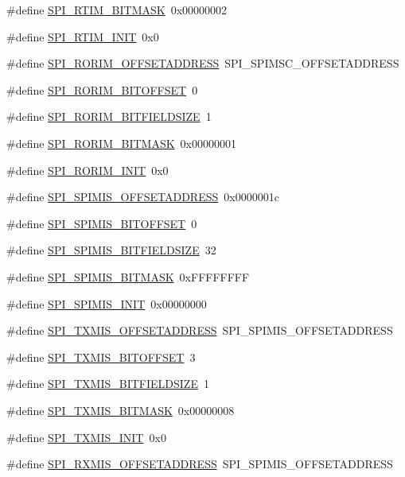 \begin{DoxyCompactItemize}
\#define \hyperlink{a00573_a226360e8192363369a8ad546547f9a1f}{SPI\_\-RTIM\_\-BITMASK}~0x00000002
\item 
\#define \hyperlink{a00573_a92d40cfc57918105d17238c10b8e492e}{SPI\_\-RTIM\_\-INIT}~0x0
\item 
\#define \hyperlink{a00573_a495f3db6f3a59bfa4e33a6a8778c19de}{SPI\_\-RORIM\_\-OFFSETADDRESS}~SPI\_\-SPIMSC\_\-OFFSETADDRESS
\item 
\#define \hyperlink{a00573_a0f4f331185afea92b5efb19347c02fec}{SPI\_\-RORIM\_\-BITOFFSET}~0
\item 
\#define \hyperlink{a00573_aa7026cd01d9579f79ab7987fa61c3e46}{SPI\_\-RORIM\_\-BITFIELDSIZE}~1
\item 
\#define \hyperlink{a00573_ae4cab1a633155b6b56dd67e53bb9d17d}{SPI\_\-RORIM\_\-BITMASK}~0x00000001
\item 
\#define \hyperlink{a00573_a0ffce744f6e410787ca6b112cc33a630}{SPI\_\-RORIM\_\-INIT}~0x0
\item 
\#define \hyperlink{a00573_adc1d8bcb31e8c25fd6524d7cebb6ed75}{SPI\_\-SPIMIS\_\-OFFSETADDRESS}~0x0000001c
\item 
\#define \hyperlink{a00573_abbf262ace71c155ba67496acc7dd735a}{SPI\_\-SPIMIS\_\-BITOFFSET}~0
\item 
\#define \hyperlink{a00573_af362e131cb4eb93e36eb27ff5c7c319b}{SPI\_\-SPIMIS\_\-BITFIELDSIZE}~32
\item 
\#define \hyperlink{a00573_a24a2e0fa5878b0c6949ad82bb66a7992}{SPI\_\-SPIMIS\_\-BITMASK}~0xFFFFFFFF
\item 
\#define \hyperlink{a00573_ace9032ae14156b64859571b63c291893}{SPI\_\-SPIMIS\_\-INIT}~0x00000000
\item 
\#define \hyperlink{a00573_a17fdcc0d678721c6e51d71df679e91a5}{SPI\_\-TXMIS\_\-OFFSETADDRESS}~SPI\_\-SPIMIS\_\-OFFSETADDRESS
\item 
\#define \hyperlink{a00573_a6625dd3bc7e72078abe177c01fa2497b}{SPI\_\-TXMIS\_\-BITOFFSET}~3
\item 
\#define \hyperlink{a00573_a7491d95e1fd8f833e57fbdde2e2e8ffb}{SPI\_\-TXMIS\_\-BITFIELDSIZE}~1
\item 
\#define \hyperlink{a00573_a7612b8971eec740196ba67c1a724f576}{SPI\_\-TXMIS\_\-BITMASK}~0x00000008
\item 
\#define \hyperlink{a00573_a1e33eb4eef42d189cc34dc24c8de91bc}{SPI\_\-TXMIS\_\-INIT}~0x0
\item 
\#define \hyperlink{a00573_a27dfb6ca9f79deb890863d46a3a51b8f}{SPI\_\-RXMIS\_\-OFFSETADDRESS}~SPI\_\-SPIMIS\_\-OFFSETADDRESS
\item 

\end{DoxyCompactItemize}
